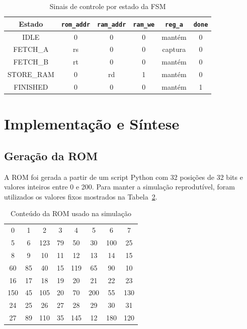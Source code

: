 \documentclass[conference]{IEEEtran}
\begin{document}
\begin{table}[!t]
\caption{Sinais de controle por estado da FSM}
\label{tab:control}
\centering
\scriptsize
\setlength{\tabcolsep}{2.5pt}
\begin{tabular}{c c c c c c}
\toprule
Estado & \texttt{rom\_addr} & \texttt{ram\_addr} & \texttt{ram\_we} & \texttt{reg\_a} & \texttt{done} \\
\midrule
IDLE & 0 & 0 & 0 & mantém & 0 \\
FETCH\_A & rs & 0 & 0 & captura & 0 \\
FETCH\_B & rt & 0 & 0 & mantém & 0 \\
STORE\_RAM & 0 & rd & 1 & mantém & 0 \\
FINISHED & 0 & 0 & 0 & mantém & 1 \\
\bottomrule
\end{tabular}
\end{table}

\section{Implementação e Síntese}

\subsection{Geração da ROM}
A ROM foi gerada a partir de um script Python com 32 posições de 32 bits e valores inteiros entre 0 e 200. Para manter a simulação reprodutível, foram utilizados os valores fixos mostrados na Tabela~\ref{tab:rom}.

\begin{table}[!t]
\caption{Conteúdo da ROM usado na simulação}
\label{tab:rom}
\centering
\scriptsize
\begin{tabular}{c c c c c c c c}
\toprule
0 & 1 & 2 & 3 & 4 & 5 & 6 & 7 \\
5 & 6 & 123 & 79 & 50 & 30 & 100 & 25 \\
\midrule
8 & 9 & 10 & 11 & 12 & 13 & 14 & 15 \\
60 & 85 & 40 & 15 & 119 & 65 & 90 & 10 \\
\midrule
16 & 17 & 18 & 19 & 20 & 21 & 22 & 23 \\
150 & 45 & 105 & 20 & 70 & 200 & 55 & 130 \\
\midrule
24 & 25 & 26 & 27 & 28 & 29 & 30 & 31 \\
27 & 89 & 110 & 35 & 145 & 12 & 180 & 120 \\
\bottomrule
\end{tabular}
\end{table}
\end{document}
